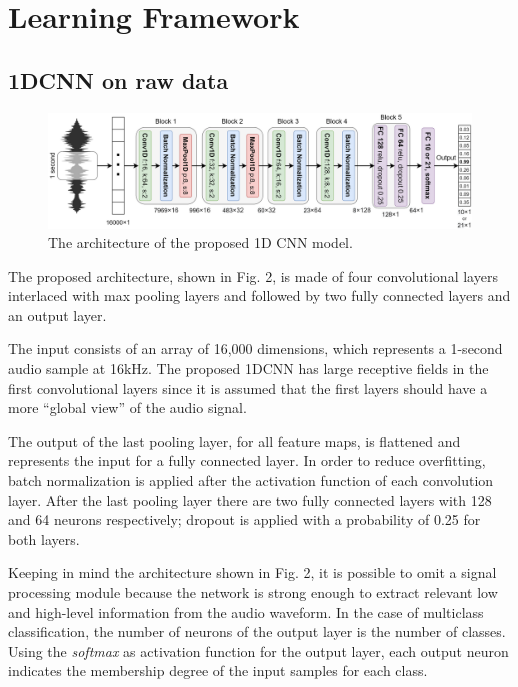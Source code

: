 \documentclass[conference]{IEEEtran}
\begin{document}
\section{Learning Framework}

\vspace{-1mm}
\subsection{1DCNN on raw data}
\begin{figure}
\centering
\includegraphics[scale=0.16]{1DCNN}
\caption{The architecture of the proposed 1D CNN model.}
\end{figure}

The proposed architecture, shown in Fig. 2, is made of four convolutional layers interlaced with max pooling layers and followed by two fully connected layers and an output layer.

The input consists of an array of 16,000 dimensions, which represents a 1-second audio sample at 16kHz.
The proposed 1DCNN has large receptive fields in the first convolutional layers since it is assumed that the first layers should have a more “global view” of the audio signal. 

The output of the last pooling layer, for all feature maps, is flattened and represents the input for a fully connected layer. In order to reduce overfitting, batch normalization is applied after the activation function of each convolution layer. After the last pooling layer there are two fully connected layers with 128 and 64 neurons respectively; dropout is applied with a probability of 0.25 for both layers.

Keeping in mind the architecture shown in Fig. 2, it is possible to omit a signal processing module because the network is strong enough to extract relevant low and high-level information from the audio waveform.
In the case of multiclass classification, the number of neurons of the output layer is the number of classes. Using the \textit{softmax} as activation function for the output layer, each output neuron indicates the membership degree of the input samples for each class.
\end{document}
